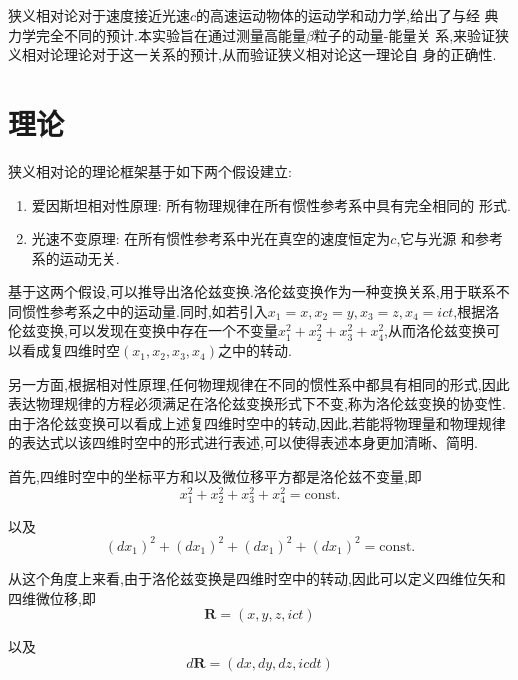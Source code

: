 \documentclass[a4paper]{article}
\begin{document}
狭义相对论对于速度接近光速$c$的高速运动物体的运动学和动力学,给出了与经
典力学完全不同的预计.本实验旨在通过测量高能量$\beta$粒子的动量-能量关
系,来验证狭义相对论理论对于这一关系的预计,从而验证狭义相对论这一理论自
身的正确性.

\newpage
\section{理论} \label{theory}%
狭义相对论的理论框架基于如下两个假设建立:

\begin{enumerate}
\item 爱因斯坦相对性原理: 所有物理规律在所有惯性参考系中具有完全相同的
  形式.
\item 光速不变原理: 在所有惯性参考系中光在真空的速度恒定为$c$,它与光源
  和参考系的运动无关.
\end{enumerate}

基于这两个假设,可以推导出洛伦兹变换.洛伦兹变换作为一种变换关系,用于联系不同惯性参考系之中的运动量.同时,如若引入$x_1 = x, x_2 = y, x_3 = z,x_4 = ict$,根据洛伦兹变换,可以发现在变换中存在一个不变量$x_1^2 + x_2^2+ x_3^2 + x_4^2$,从而洛伦兹变换可以看成复四维时空$(x_1, x_2, x_3,x_4)$之中的转动.

另一方面,根据相对性原理,任何物理规律在不同的惯性系中都具有相同的形式,因此表达物理规律的方程必须满足在洛伦兹变换形式下不变,称为洛伦兹变换的协变性.由于洛伦兹变换可以看成上述复四维时空中的转动,因此,若能将物理量和物理规律的表达式以该四维时空中的形式进行表述,可以使得表述本身更加清晰、简明.

首先,四维时空中的坐标平方和以及微位移平方都是洛伦兹不变量,即
\begin{equation}
  \label{eq:const1}
  x_1^2 + x_2^2 + x_3^2 + x_4^2 = \text{const.}
\end{equation}

以及
\begin{equation}
  \label{eq:const2}
  (dx_1)^2 + (dx_1)^2 + (dx_1)^2 + (dx_1)^2 = \text{const.}
\end{equation}

从这个角度上来看,由于洛伦兹变换是四维时空中的转动,因此可以定义四维位矢和四维微位移,即
\begin{equation}
  \label{eq:4vecr}
  \bm{R} = (x,y,z,ict)
\end{equation}

以及
\begin{equation}
  \label{eq:4vecdr}
  d\bm{R} = (dx,dy,dz,icdt)
\end{equation}
\end{document}
